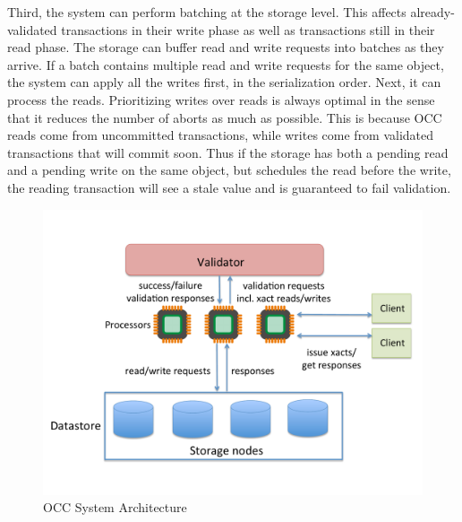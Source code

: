 Third, the system can perform batching at the storage level. This affects already-validated transactions in their write phase as well as transactions still in their read phase. The storage can buffer read and write requests into batches as they arrive. If a batch contains multiple read and write requests for the same object, the system can apply all the writes first, in the serialization order. Next, it can process the reads. Prioritizing writes over reads is always optimal in the sense that it reduces the number of aborts as much as possible. This is because OCC reads come from uncommitted transactions, while writes come from validated transactions that will commit soon. Thus if the storage has both a pending read and a pending write on the same object, but schedules the read before the write, the reading transaction will see a stale value and is guaranteed to fail validation. 


\begin{figure}[t]
 \centering
 \includegraphics[width=0.7\columnwidth]{figures/OCCArchitecture.pdf}
 \vspace{-.5em}
 \caption{OCC System Architecture}
 \vspace{-1.5em}
 \label{fig:occ_arch}
\end{figure}


